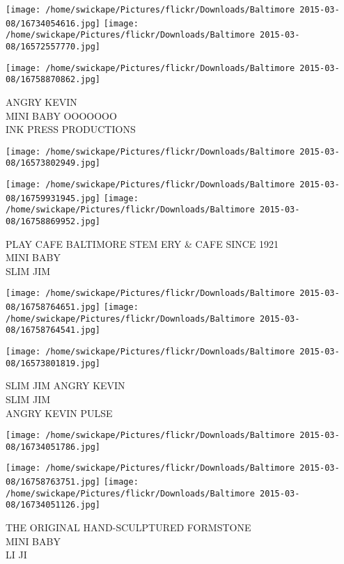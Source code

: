 \documentclass[10pt,letterpaper]{article}
\begin{document}
\texttt{[image: /home/swickape/Pictures/flickr/Downloads/Baltimore 2015-03-08/16734054616.jpg]}
\texttt{[image: /home/swickape/Pictures/flickr/Downloads/Baltimore 2015-03-08/16572557770.jpg]}

\texttt{[image: /home/swickape/Pictures/flickr/Downloads/Baltimore 2015-03-08/16758870862.jpg]}

ANGRY KEVIN\\
MINI BABY OOOOOOO\\
INK PRESS PRODUCTIONS\\
\pagebreak

\texttt{[image: /home/swickape/Pictures/flickr/Downloads/Baltimore 2015-03-08/16573802949.jpg]}

\vspace{0.25in}
\texttt{[image: /home/swickape/Pictures/flickr/Downloads/Baltimore 2015-03-08/16759931945.jpg]}
\texttt{[image: /home/swickape/Pictures/flickr/Downloads/Baltimore 2015-03-08/16758869952.jpg]}

PLAY CAFE BALTIMORE STEM ERY \& CAFE SINCE 1921\\
MINI BABY\\
SLIM JIM\\
\pagebreak

\texttt{[image: /home/swickape/Pictures/flickr/Downloads/Baltimore 2015-03-08/16758764651.jpg]}
\texttt{[image: /home/swickape/Pictures/flickr/Downloads/Baltimore 2015-03-08/16758764541.jpg]}

\texttt{[image: /home/swickape/Pictures/flickr/Downloads/Baltimore 2015-03-08/16573801819.jpg]}

SLIM JIM ANGRY KEVIN\\
SLIM JIM\\
ANGRY KEVIN PULSE\\
\pagebreak

\texttt{[image: /home/swickape/Pictures/flickr/Downloads/Baltimore 2015-03-08/16734051786.jpg]}

\vspace{0.25in}
\texttt{[image: /home/swickape/Pictures/flickr/Downloads/Baltimore 2015-03-08/16758763751.jpg]}
\texttt{[image: /home/swickape/Pictures/flickr/Downloads/Baltimore 2015-03-08/16734051126.jpg]}

THE ORIGINAL HAND{-}SCULPTURED FORMSTONE\\
MINI BABY\\
LI JI\\
\pagebreak
\end{document}
